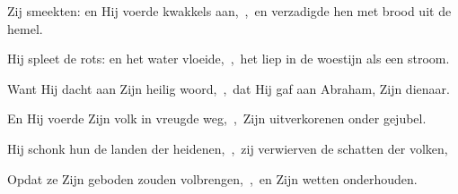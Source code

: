 \documentclass[12pt,twoside,a5paper]{article}
\begin{document}
\begin{halfparskip}
  Zij smeekten: en Hij voerde kwakkels aan,~\sep\ en verzadigde hen met brood uit de hemel.

  Hij spleet de rots: en het water vloeide,~\sep\ het liep in de woestijn als een stroom.

  Want Hij dacht aan Zijn heilig woord,~\sep\ dat Hij gaf aan Abraham, Zijn dienaar.

  En Hij voerde Zijn volk in vreugde weg,~\sep\ Zijn uitverkorenen onder gejubel.

  Hij schonk hun de landen der heidenen,~\sep\ zij verwierven de schatten der volken,

  Opdat ze Zijn geboden zouden volbrengen,~\sep\ en Zijn wetten onderhouden.
\end{halfparskip}

\end{document}
